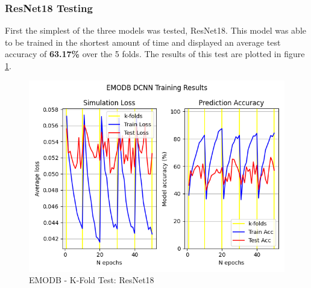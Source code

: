 \subsubsection{ResNet18 Testing}
First the simplest of the three models was tested, ResNet18. This model was able to be trained in the shortest amount of time and displayed an average test accuracy of \textbf{63.17\%} over the 5 folds. The results of this test are plotted in figure \ref{pilot_r18_fig}. 
\begin{figure}[ht]
        \centering
        \includegraphics[scale = 0.6]{images_results/EMODB-FinalResults/EMODB_TrainResults_30-05__19-27.png}
        \caption{EMODB - K-Fold Test: ResNet18}
        \label{pilot_r18_fig}
\end{figure}
